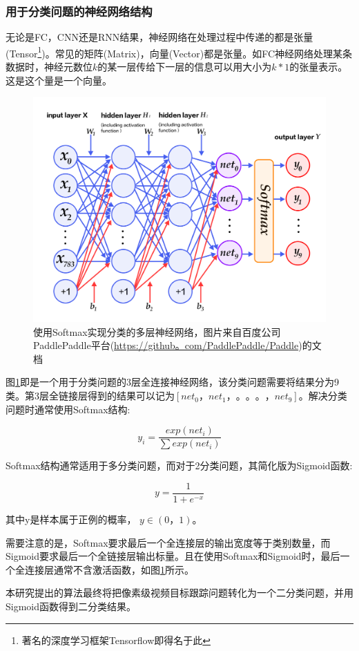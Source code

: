 \subsubsection{用于分类问题的神经网络结构}
\par
无论是FC，CNN还是RNN结果，神经网络在处理过程中传递的都是张量(Tensor\footnote{著名的深度学习框架Tensorflow\supercite{abadi2016tensorflow}即得名于此})。常见的矩阵(Matrix)，向量(Vector)都是张量。如FC神经网络处理某条数据时，神经元数位$k$的某一层传给下一层的信息可以用大小为$k*1$的张量表示。这是这个量是一个向量。
\par
\begin{figure}[htbp!]
    \centering
    \includegraphics[width = 1.\textwidth]{chap/img/mlp_paddle.png}
    \caption{
        使用Softmax实现分类的多层神经网络，图片来自百度公司PaddlePaddle平台(\url{https://github。com/PaddlePaddle/Paddle})的文档\supercite{recognize_digits_paddle}
        }\label{fig:mlp_paddle}
\end{figure}
\par
图\ref{fig:mlp_paddle}即是一个用于分类问题的3层全连接神经网络，该分类问题需要将结果分为9类。第3层全链接层得到的结果可以记为$[net_0，net_1，。。。，net_9]$。解决分类问题时通常使用Softmax结构:
\par
\begin{equation} y_i = \frac{exp(net_i)}{\sum{ exp(net_i) }}  \end{equation}
\par
Softmax结构通常适用于多分类问题，而对于2分类问题，其简化版为Sigmoid函数:
\par
\begin{equation} y = \frac{1}{1+e^{-x}}  \end{equation}
\par
其中y是样本属于正例的概率， $y\in (0，1)$。
\par
需要注意的是，Softmax要求最后一个全连接层的输出宽度等于类别数量，而Sigmoid要求最后一个全链接层输出标量。且在使用Softmax和Sigmoid时，最后一个全连接层通常不含激活函数，如图\ref{fig:mlp_paddle}所示。
\par
本研究提出的算法最终将把像素级视频目标跟踪问题转化为一个二分类问题，并用Sigmoid函数得到二分类结果。

